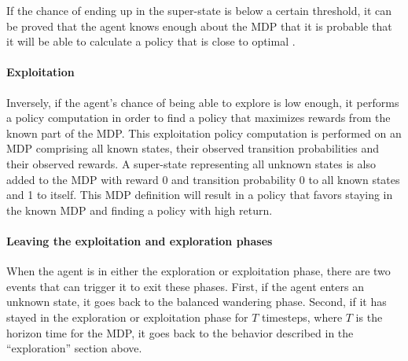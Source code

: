 If the chance of ending up in the super-state is below a certain threshold, it can be proved that the agent knows enough about the MDP that it is probable that it will be able to calculate a policy that is close to optimal \parencite{kearns2002near}.

\paragraph{Exploitation}
Inversely, if the agent's chance of being able to explore is low enough, it performs a policy computation in order to find a policy that maximizes rewards from the known part of the MDP. This exploitation policy computation is performed on an MDP comprising all known states, their observed transition probabilities and their observed rewards. A super-state representing all unknown states is also added to the MDP with reward 0 and transition probability 0 to all known states and 1 to itself. This MDP definition will result in a policy that favors staying in the known MDP and finding a policy with high return.

\paragraph{Leaving the exploitation and exploration phases}
When the agent is in either the exploration or exploitation phase, there are two events that can trigger it to exit these phases. First, if the agent enters an unknown state, it goes back to the balanced wandering phase. Second, if it has stayed in the exploration or exploitation phase for $T$ timesteps, where $T$ is the horizon time for the MDP, it goes back to the behavior described in the ``exploration'' section above.

